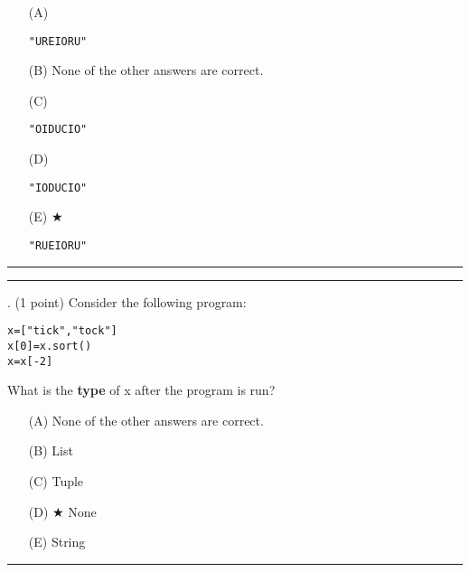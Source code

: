 \documentclass{article}
\begin{document}
\begin{enumerate}
\item[(A)]
\begin{verbatim}"UREIORU"\end{verbatim}

\item[(B)]
None of the other answers are correct.

\item[(C)]
\begin{verbatim}"OIDUCIO"\end{verbatim}

\item[(D)]
\begin{verbatim}"IODUCIO"\end{verbatim}

\item[(E)] $\bigstar$ 
\begin{verbatim}"RUEIORU"\end{verbatim}

\end{enumerate}

\vspace*{2em}
\hrule
\vspace{2em}

\vspace{2em}
\hrule height 2pt


\newpage
{}. (1 point)
Consider the following program:
\begin{verbatim}
x=["tick","tock"]
x[0]=x.sort()
x=x[-2]
\end{verbatim}
What is the \textbf{type} of x after the program is run?


\begin{enumerate}
\item[(A)]
None of the other answers are correct.

\item[(B)]
List

\item[(C)]
Tuple

\item[(D)] $\bigstar$ 
None

\item[(E)]
String

\end{enumerate}

\vspace*{2em}
\hrule
\vspace{2em}
\end{document}
